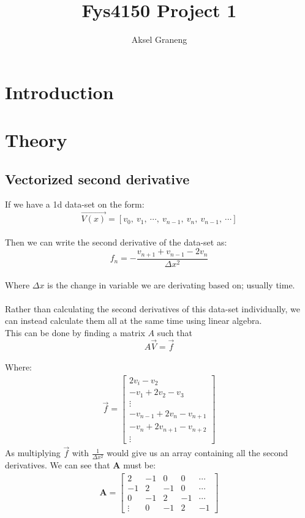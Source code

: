 \documentclass[a4paper,12pt,norsk]{article}
\title{Fys4150 Project 1}
\author{Aksel Graneng}
\begin{document}
\maketitle


\section{Introduction}

\section{Theory}

\subsection*{Vectorized second derivative}

	If we have a 1d data-set on the form:
	$$\vec{V(x)} = [v_0,\ v_1,\ \cdots,\ v_{n-1},\ v_{n},\ v_{n-1},\ \cdots] $$\\
	Then we can write the second derivative of the data-set as:
	$$f_n = -\frac{v_{n+1} + v_{n-1} - 2v_n}{\Delta x^2} $$\\
	Where $\Delta x$ is the change in variable we are derivating based on; usually time.\\
	\\
	Rather than calculating the second derivatives of this data-set individually, we can instead calculate them all at the same time using linear algebra.\\
	This can be done by finding a matrix $A$ such that
	$$A\vec{V} = \vec{f} $$\\
	Where:
	\begin{gather*}
	\vec{f} = \left[
	\begin{array}{c}
	2v_i - v_2\\
	-v_1 + 2v_2 - v_3\\
	\vdots\\
	-v_{n-1} + 2v_n -v_{n+1}\\
	-v_n + 2v_{n+1} - v_{n+2}\\
	\vdots
	\end{array}
	\right]
	\end{gather*}
	As multiplying $\vec{f}$ with $\frac{1}{\Delta x^2}$ would give us an array containing all the second derivatives. We can see that $\textbf{A}$ must be:
	\begin{gather*}
	\textbf{A} = \left[
	\begin{array}{ccccc}
	2 & -1 & 0 & 0 & \cdots\\
	-1 & 2 & -1 & 0 & \cdots\\
	0 & -1 & 2 & -1 & \cdots\\
	\vdots & 0 & -1 & 2 & -1
	\end{array}
	\right]
	\end{gather*}
\end{document}
